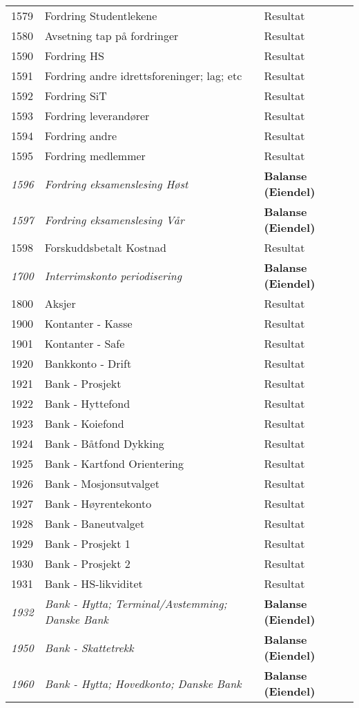 \begin{longtable}{l l l}
1579 & Fordring Studentlekene & Resultat\\
1580 & Avsetning tap på fordringer & Resultat\\
1590 & Fordring HS & Resultat\\
1591 & Fordring andre idrettsforeninger; lag; etc & Resultat\\
1592 & Fordring SiT & Resultat\\
1593 & Fordring leverandører & Resultat\\
1594 & Fordring andre & Resultat\\
1595 & Fordring medlemmer & Resultat\\
\emph{1596} & \emph{Fordring eksamenslesing Høst} & {\bfseries Balanse (Eiendel)}\\
\emph{1597} & \emph{Fordring eksamenslesing Vår} & {\bfseries Balanse (Eiendel)}\\
1598 & Forskuddsbetalt Kostnad & Resultat\\
\emph{1700} & \emph{Interrimskonto periodisering} & {\bfseries Balanse (Eiendel)}\\
1800 & Aksjer & Resultat\\
1900 & Kontanter - Kasse & Resultat\\
1901 & Kontanter - Safe & Resultat\\
1920 & Bankkonto - Drift & Resultat\\
1921 & Bank - Prosjekt & Resultat\\
1922 & Bank - Hyttefond & Resultat\\
1923 & Bank - Koiefond & Resultat\\
1924 & Bank - Båtfond Dykking & Resultat\\
1925 & Bank - Kartfond Orientering & Resultat\\
1926 & Bank - Mosjonsutvalget & Resultat\\
1927 & Bank - Høyrentekonto & Resultat\\
1928 & Bank - Baneutvalget & Resultat\\
1929 & Bank - Prosjekt 1 & Resultat\\
1930 & Bank - Prosjekt 2 & Resultat\\
1931 & Bank - HS-likviditet & Resultat\\
\emph{1932} & \emph{Bank - Hytta; Terminal/Avstemming; Danske Bank} & {\bfseries Balanse (Eiendel)}\\
\emph{1950} & \emph{Bank - Skattetrekk} & {\bfseries Balanse (Eiendel)}\\
\emph{1960} & \emph{Bank - Hytta; Hovedkonto; Danske Bank} & {\bfseries Balanse (Eiendel)}\\

\end{longtable}
